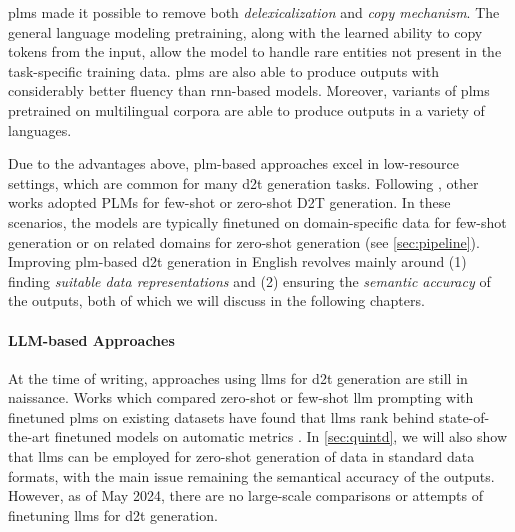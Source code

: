 {\acp{plm} made it possible to remove both \emph{delexicalization} and \emph{copy mechanism}. The general language modeling pretraining, along with the learned ability to copy tokens from the input, allow the model to handle rare entities not present in the task-specific training data. \acp{plm} are also able to produce outputs with considerably better fluency than \ac{rnn}-based models. Moreover, variants of \acp{plm} pretrained on multilingual corpora \cite{liuMultilingualDenoisingPretraining2020,xueMT5MassivelyMultilingual2021} are able to produce outputs in a variety of languages.

Due to the advantages above, \ac{plm}-based approaches excel in low-resource settings, which are common for many \ac{d2t} generation tasks. Following \citet{chenFewShotNLGPreTrained2019}, other works adopted PLMs for few-shot or zero-shot D2T generation. In these scenarios, the models are typically finetuned on domain-specific data for few-shot generation \cite{changNeuralDatatoTextGeneration2021,suFewShotTabletoTextGeneration2021} or on related domains for zero-shot generation (see \autoref{sec:pipeline}). Improving \ac{plm}-based \ac{d2t} generation in English revolves mainly around (1) finding \emph{suitable data representations} and (2) ensuring the \emph{semantic accuracy} of the outputs, both of which we will discuss in the following chapters.

\paragraph{LLM-based Approaches} At the time of writing, approaches using \acp{llm} for \ac{d2t} generation are still in naissance. Works which compared zero-shot or few-shot \ac{llm} prompting with finetuned \acp{plm} on existing datasets have found that \acp{llm} rank behind state-of-the-art finetuned models on automatic metrics \cite{axelssonUsingLargeLanguage2023,yuanEvaluatingGenerativeModels2023}. In \autoref{sec:quintd}, we will also show that \acp{llm} can be employed for zero-shot generation of data in standard data formats, with the main issue remaining the semantical accuracy of the outputs. However, as of May 2024, there are no large-scale comparisons or attempts of finetuning \acp{llm} for \ac{d2t} generation.


}
